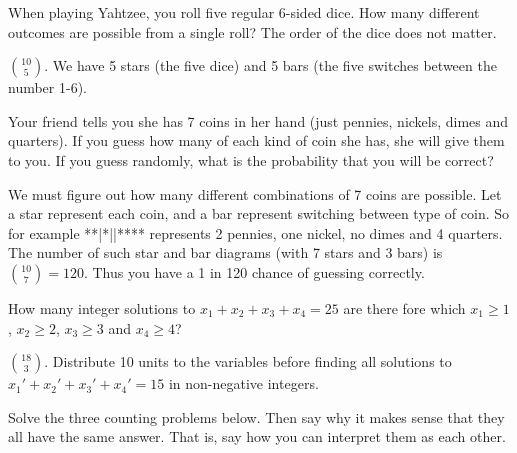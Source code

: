 \begin{questions}
\question When playing Yahtzee, you roll five regular 6-sided dice.  How many different outcomes are possible from a single roll?  The order of the dice does not matter.

	\begin{answer}
	${10 \choose 5}$.  We have 5 stars (the five dice) and 5 bars (the five switches between the number 1-6).
	\end{answer}
	
	

\question Your friend tells you she has 7 coins in her hand (just pennies, nickels, dimes and quarters).  If you guess how many of each kind of coin she has, she will give them to you.  If you guess randomly, what is the probability that you will be correct?

	\begin{answer}
	 We must figure out how many different combinations of 7 coins are possible.  Let a star represent each coin, and a bar represent switching between type of coin.  So for example **|*||**** represents 2 pennies, one nickel, no dimes and 4 quarters.  The number of such star and bar diagrams (with 7 stars and 3 bars) is ${10 \choose 7} = 120$.  Thus you have a 1 in 120 chance of guessing correctly.
	\end{answer}



\question How many integer solutions to $x_1 + x_2 + x_3 + x_4  = 25$ are there fore which $x_1 \ge 1$, $x_2 \ge 2$, $x_3 \ge 3$  and $x_4 \ge 4$?

	\begin{answer}
	${18 \choose 3}$.  Distribute 10 units to the variables before finding all solutions to $x_1' + x_2' + x_3' + x_4' = 15$ in non-negative integers.
	\end{answer}
	




\question Solve the three counting problems below.  Then say why it makes sense that they all have the same answer.  That is, say how you can interpret them as each other.

\end{questions}
